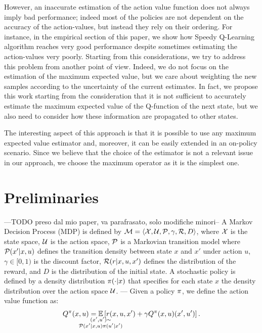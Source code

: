 \documentclass[conference]{IEEEtran}
\begin{document}
However, an inaccurate estimation of the action value function does not always imply bad performance; indeed most of the policies are not dependent on the accuracy of the action-values, but instead they rely on their ordering. For instance, in the empirical section of this paper, we show how Speedy Q-Learning algorithm \cite{NIPS2011_4251} reaches very good performance despite sometimes estimating the action-values very poorly. Starting from this considerations, we try to address this problem from another point of view. Indeed, we do not focus on the estimation of the maximum expected value, but we care about weighting the new samples according to the uncertainty of the current estimates.
In fact, we propose this work starting from the consideration that it is not sufficient to accurately estimate the maximum expected value of the Q-function of the next state, but we also need to consider how these information are propagated to other states.

The interesting aspect of this approach is that it is possible to use any maximum expected value estimator and, moreover, it can be easily extended in an on-policy scenario. Since we believe that the choice of the estimator is not a relevant issue in our approach, we choose the maximum operator as it is the simplest one.

\section{Preliminaries}
---TODO preso dal mio paper, va parafrasato, solo modifiche minori--
A Markov Decision Process (MDP) is defined by $\mathcal{M} = \langle \mathcal X,\mathcal U,\mathcal{P},\gamma,\mathcal{R}, D\rangle$, where $\mathcal X$ is the state space, $\mathcal U$ is the action space, $\mathcal{P}$ is a Markovian transition model where $\mathcal{P}(x'|x,u)$ defines the transition density between state $x$ and $x'$ under action $u$, $\gamma\in[0,1)$ is the discount factor, $\mathcal{R}(r|x, u, x')$ defines the distribution of the reward, and $D$ is the distribution of the initial state.
A stochastic policy is defined by a density distribution $\pi(\cdot|x)$ that specifies for each state $x$ the density distribution over the action space $\mathcal U$.
---
Given a policy $\pi$, we define the action value function as:
\begin{align}
 Q^\pol(x,u)=\underset{\strut\mathclap{\substack{(x', u')\sim \\ \Pmodel(x'|x,u)\pol(u'|x')}}}{\mathbb{E}}\left[ r(x,u,x')+\gamma Q^\pol(x,u)(x',u')\right].
 \label{eq:qpol}
\end{align}
\end{document}
